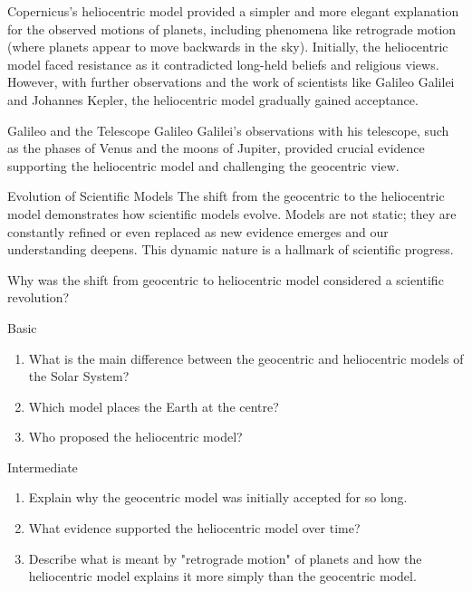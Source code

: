 Copernicus's heliocentric model provided a simpler and more elegant explanation for the observed motions of planets, including phenomena like retrograde motion (where planets appear to move backwards in the sky).  Initially, the heliocentric model faced resistance as it contradicted long-held beliefs and religious views. However, with further observations and the work of scientists like Galileo Galilei and Johannes Kepler, the heliocentric model gradually gained acceptance.

\begin{historylink}{Galileo and the Telescope}
Galileo Galilei's observations with his telescope, such as the phases of Venus and the moons of Jupiter, provided crucial evidence supporting the heliocentric model and challenging the geocentric view.
\end{historylink}

\begin{keyconcept}{Evolution of Scientific Models}
The shift from the geocentric to the heliocentric model demonstrates how scientific models evolve.  Models are not static; they are constantly refined or even replaced as new evidence emerges and our understanding deepens. This dynamic nature is a hallmark of scientific progress.
\end{keyconcept}

\begin{stopandthink}
Why was the shift from geocentric to heliocentric model considered a scientific revolution?
\end{stopandthink}

\begin{tieredquestions}{Basic}
\begin{enumerate}
    \item What is the main difference between the geocentric and heliocentric models of the Solar System?
    \item Which model places the Earth at the centre?
    \item Who proposed the heliocentric model?
\end{enumerate}
\end{tieredquestions}

\begin{tieredquestions}{Intermediate}
\begin{enumerate}
    \item Explain why the geocentric model was initially accepted for so long.
    \item What evidence supported the heliocentric model over time?
    \item Describe what is meant by "retrograde motion" of planets and how the heliocentric model explains it more simply than the geocentric model.
\end{enumerate}
\end{tieredquestions}

